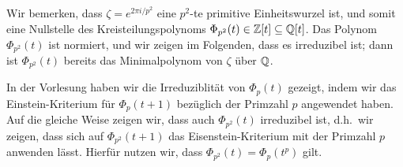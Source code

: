 Wir bemerken, dass $\zeta = e^{2 \pi i / p^2}$ eine $p^2$-te primitive Einheitswurzel ist, und somit eine Nullstelle des Kreisteilungspolynoms $\Phi_{p^2}(t) \in \mathbb{Z}[t] \subseteq \mathbb{Q}[t]$.
Das Polynom $\Phi_{p^2}(t)$ ist normiert, und wir zeigen im Folgenden, dass es irreduzibel ist;
dann ist $\Phi_{p^2}(t)$ bereits das Minimalpolynom von $\zeta$ über $\mathbb{Q}$.

In der Vorlesung haben wir die Irreduziblität von $\Phi_p(t)$ gezeigt, indem wir das Einstein-Kriterium für $\Phi_p(t+1)$ bezüglich der Primzahl $p$ angewendet haben.
Auf die gleiche Weise zeigen wir, dass auch $\Phi_{p^2}(t)$ irreduzibel ist, d.h.\ wir zeigen, dass sich auf $\Phi_{p^2}(t+1)$ das Eisenstein-Kriterium mit der Primzahl $p$ anwenden lässt.
Hierfür nutzen wir, dass $\Phi_{p^2}(t) = \Phi_p(t^p)$ gilt.

